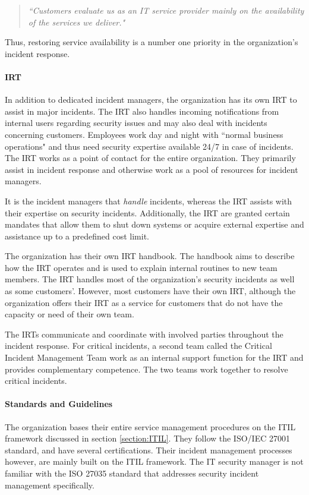 \begin{quote}
\textit{``Customers evaluate us as an IT service provider mainly on the availability of the services we deliver."}
\end{quote}
Thus, restoring service availability is a number one priority in the organization's incident response.

\paragraph{\acl{IRT}}
In addition to dedicated incident managers, the organization has its own \ac{IRT} to assist in major incidents. The \ac{IRT} also handles incoming notifications from internal users regarding security issues and may also deal with incidents concerning customers. Employees work day and night with ``normal business operations" and thus need security expertise available 24/7 in case of incidents. The \ac{IRT} works as a point of contact for the entire organization. They primarily assist in incident response and otherwise work as a pool of resources for incident managers. 

It is the incident managers that \emph{handle} incidents, whereas the \ac{IRT} assists with their expertise on security incidents. Additionally, the \ac{IRT} are granted certain mandates that allow them to shut down systems or acquire external expertise and assistance up to a predefined cost limit.    

The organization has their own \ac{IRT} handbook. The handbook aims to describe how the \ac{IRT} operates and is used to explain internal routines to new team members. The \ac{IRT} handles most of the organization's security incidents as well as some customers'. However, most customers have their own \ac{IRT}, although the organization offers their \ac{IRT} as a service for customers that do not have the capacity or need of their own team.

The \acp{IRT} communicate and coordinate with involved parties throughout the incident response. For critical incidents, a second team called the Critical Incident Management Team work as an internal support function for the \ac{IRT} and provides complementary competence. The two teams work together to resolve critical incidents. 

\paragraph{Standards and Guidelines}
The organization bases their entire service management procedures on the ITIL framework discussed in section \ref{section:ITIL}. They follow the ISO/IEC 27001 standard, and have several certifications. Their incident management processes however, are mainly built on the ITIL framework. The IT security manager is not familiar with the ISO 27035 standard that addresses security incident management specifically. 

